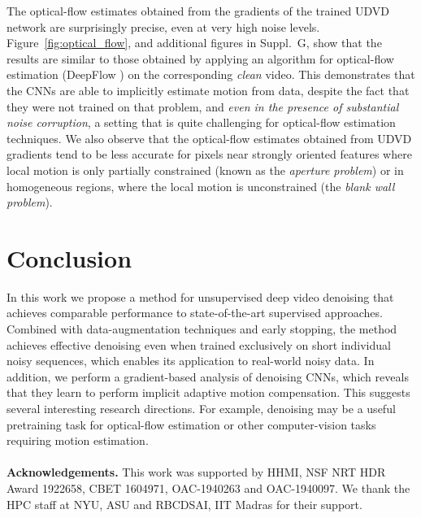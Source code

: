 \documentclass[final]{cvpr}
\begin{document}
The optical-flow estimates obtained from the gradients of the trained UDVD network are surprisingly precise, even at very high noise levels. Figure~\ref{fig:optical_flow}, and additional figures in Suppl.~G, show that the results are similar to those obtained by applying an algorithm for optical-flow estimation (DeepFlow \cite{deepflow}) on the corresponding \emph{clean} video. 
This demonstrates that the CNNs are able to implicitly estimate motion from data, despite the fact that they were not trained on that problem, and \emph{even in the presence of substantial noise corruption}, a setting that is quite challenging for optical-flow estimation techniques. 
We also observe that the optical-flow estimates obtained from UDVD gradients tend to be less accurate for pixels near strongly oriented features where local motion is only partially constrained (known as the \emph{aperture problem}) or in homogeneous regions, where the local motion is unconstrained (the \emph{blank wall problem}). 

\section{Conclusion}

In this work we propose a method for unsupervised deep video denoising that achieves comparable performance to state-of-the-art supervised approaches. Combined with data-augmentation techniques and early stopping, the method achieves effective denoising even when trained exclusively on short individual noisy sequences, which enables its application to real-world noisy data. In addition, we perform a gradient-based analysis of denoising CNNs, which reveals that they learn to perform implicit adaptive motion compensation. This suggests several interesting research directions. For example, denoising may be a useful pretraining task for optical-flow estimation or other computer-vision tasks requiring motion estimation.
\\~\\
\noindent \textbf{Acknowledgements.} This work was supported by HHMI, NSF NRT HDR Award 1922658, CBET 1604971, OAC-1940263 and OAC-1940097. We thank the HPC staff at NYU, ASU and RBCDSAI, IIT Madras for their support.
\end{document}
